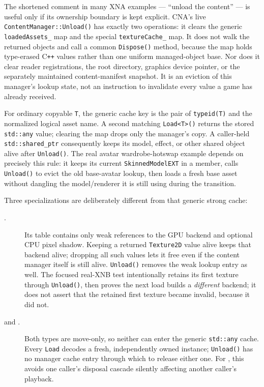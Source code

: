 The shortened comment in many XNA examples --- ``unload the content'' --- is useful only if its
ownership boundary is kept explicit. CNA's live \texttt{ContentManager::Unload()} has exactly two
operations: it clears the generic \texttt{loadedAssets\_} map and the special
\texttt{textureCache\_} map. It does not walk the returned objects and call a common
\texttt{Dispose()} method, because the map holds type-erased C\texttt{++} values rather than one
uniform managed-object base. Nor does it clear reader registrations, the root directory, graphics
device pointer, or the separately maintained content-manifest snapshot. It is an eviction of this
manager's lookup state, not an instruction to invalidate every value a game has already received.

For ordinary copyable \texttt{T}, the generic cache key is the pair of \texttt{typeid(T)} and the
normalized logical asset name. A second matching \texttt{Load<T>()} returns the stored
\texttt{std::any} value; clearing the map drops only the manager's copy. A caller-held
\texttt{std::shared\_ptr} consequently keeps its model, effect, or other shared object alive after
\texttt{Unload()}. The real avatar wardrobe-hotswap example depends on precisely this rule: it
keeps its current \texttt{SkinnedModelEXT} in a member, calls \texttt{Unload()} to evict the old
base-avatar lookup, then loads a fresh base asset without dangling the model/renderer it is still
using during the transition.

Three specializations are deliberately different from that generic strong cache:

\begin{description}
  \item[.] Its table contains only weak references to the GPU backend and
    optional CPU pixel shadow. Keeping a returned \texttt{Texture2D} value alive keeps that
    backend alive; dropping all such values lets it free even if the content manager itself is
    still alive. \texttt{Unload()} removes the weak lookup entry as well. The focused real-XNB
    test intentionally retains its first texture through \texttt{Unload()}, then proves the
    next load builds a \emph{different} backend; it does not assert that the retained first
    texture became invalid, because it did not.
  \item[ and .] Both types are move-only, so neither
    can enter the generic \texttt{std::any} cache. Every \texttt{Load} decodes a fresh,
    independently owned instance; \texttt{Unload()} has no manager cache entry through which to
    release either one. For , this avoids one caller's disposal cascade
    silently affecting another caller's playback.
\end{description}


